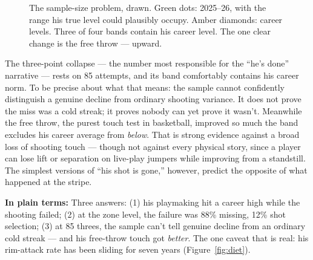 \documentclass[11pt]{article}
\newcommand{\plainbox}[1]{\par\medskip\noindent\begin{center}%
\colorbox{court!8}{\parbox{0.93\textwidth}{\small \textbf{\textcolor{court}{In plain terms:}} #1}}%
\end{center}\medskip}
\begin{document}
\begin{figure}[h]
\centering
{}
\caption{The sample-size problem, drawn. Green dots: 2025--26, with the range his true
level could plausibly occupy. Amber diamonds: career levels. Three of four bands contain
his career level. The one clear change is the free throw --- upward.}
\label{fig:ci}
\end{figure}

The three-point collapse --- the number most responsible for the ``he's done'' narrative
--- rests on 85 attempts, and its band comfortably contains his career norm. To be
precise about what that means: the sample cannot confidently distinguish a genuine
decline from ordinary shooting variance. It does not prove the miss was a cold streak;
it proves nobody can yet prove it wasn't. Meanwhile the free throw, the purest touch
test in basketball, improved so much the band excludes his career average from
\emph{below}. That is strong evidence against a broad loss of shooting touch --- though
not against every physical story, since a player can lose lift or separation on live-play
jumpers while improving from a standstill. The simplest versions of ``his shot is
gone,'' however, predict the opposite of what happened at the stripe.

\plainbox{Three answers: (1) his playmaking hit a career high while the shooting failed;
(2) at the zone level, the failure was 88\% missing, 12\% shot selection; (3) at 85
threes, the sample can't tell genuine decline from an ordinary cold streak --- and his
free-throw touch got \emph{better}. The one caveat that is real: his rim-attack rate has
been sliding for seven years (Figure~\ref{fig:diet}).}
\end{document}
